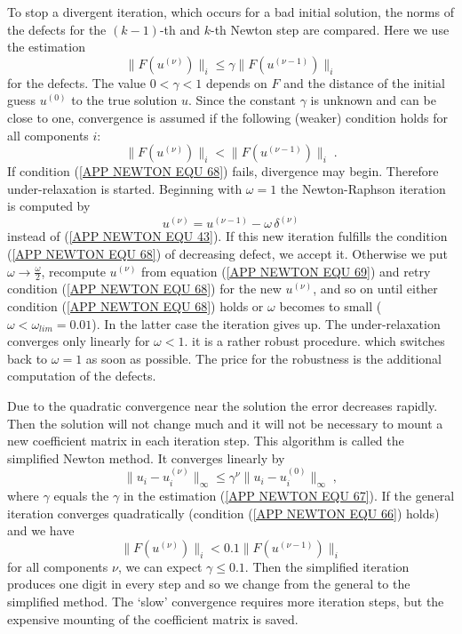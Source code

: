 To stop a divergent iteration, which occurs for a bad initial solution,
the norms of the defects for the $(k-1)$-th and $k$-th
Newton step are compared.  Here we use the estimation
\begin{equation} \label{APP NEWTON EQU 67}
  \| F(u^{(\nu)}) \|_i \le
  \gamma \| F(u^{(\nu-1)}) \|_i
\end{equation}
for the defects.  The value $0<\gamma<1$ depends on $F$
and the distance of the initial guess $u^{(0)}$ to the true solution $u$.
Since the constant $\gamma$ is unknown and can be close to one,
convergence is assumed if the following (weaker) condition holds
for all components $i$:
\begin{equation} \label{APP NEWTON EQU 68}
  \| F(u^{(\nu)}) \|_i
  < \| F(u^{(\nu-1)}) \|_i \; .
\end{equation}
If condition (\ref{APP NEWTON EQU 68}) fails, divergence may begin. Therefore
under-relaxation is started.  Beginning with $\omega=1$
the Newton-Raphson iteration is computed by
\begin{equation} \label{APP NEWTON EQU 69}
  u^{(\nu)} = u^{(\nu-1)} - \omega \, \delta^{(\nu)}
\end{equation}
instead of (\ref{APP NEWTON EQU 43}).  If this new iteration fulfills the
condition (\ref{APP NEWTON EQU 68}) of decreasing defect, we accept it.  Otherwise
we put $\omega \rightarrow \frac{\omega}{2}$, recompute $u^{(\nu)}$ from equation
(\ref{APP NEWTON EQU 69}) and retry condition (\ref{APP NEWTON EQU 68}) for the
new $u^{(\nu)}$, and so on until either condition (\ref{APP NEWTON EQU 68})
holds or $\omega$ becomes to small ($\omega < \omega_{lim}=0.01$).  In the latter case the
iteration gives up. The under-relaxation
converges only linearly for $\omega<1$. it is a rather robust
procedure.
 which switches back to $\omega=1$ as soon as possible.
The price for the robustness is the additional computation of the
defects.

Due to the quadratic convergence near the solution the error decreases
rapidly.  Then the solution will not change much and it will not be
necessary to mount a new coefficient matrix in each iteration step.
This algorithm is called the simplified Newton method.  It converges
linearly by
\begin{equation} 
    \| u_i - u^{(\nu)}_i \|_{\infty} \le \gamma^{\nu}
    \| u_i - u ^{(0)}_i \|_{\infty} \; ,
\end{equation}
where $\gamma$ equals the $\gamma$ in the estimation (\ref{APP NEWTON EQU 67}).
If the general iteration converges quadratically
(condition (\ref{APP NEWTON EQU 66}) holds) and we have
\begin{equation}
   \| F(u^{(\nu)}) \|_i < 0.1
              \| F(u^{(\nu-1)}) \|_i
\end{equation}
for all components $\nu$,
we can expect $\gamma \le 0.1$.  Then the simplified iteration produces
one digit in every step and so we change from the general to the
simplified method.  The `slow' convergence requires more iteration steps,
but the expensive mounting of the coefficient matrix is saved.

